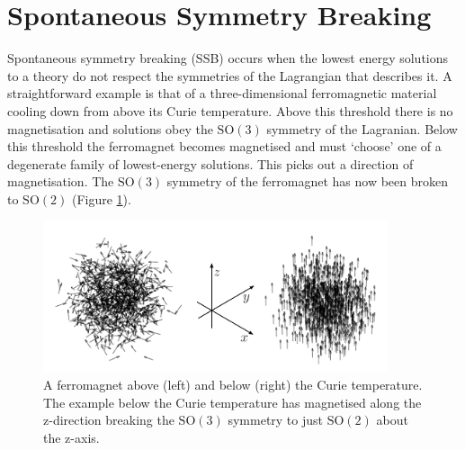 \section{Spontaneous Symmetry Breaking}
Spontaneous symmetry breaking (SSB) occurs when the lowest energy solutions to a theory do not respect the symmetries of the Lagrangian that describes it. 
A straightforward example \cite{Maggiore} is that of a three-dimensional ferromagnetic material cooling down from above its Curie temperature.
Above this threshold there is no magnetisation and solutions obey the $\mathrm{SO}(3)$ symmetry of the Lagranian. 
Below this threshold the ferromagnet becomes magnetised and must `choose' one of a degenerate family of lowest-energy solutions. This picks out a direction of magnetisation. The $\mathrm{SO}(3)$ symmetry of the ferromagnet has now been broken to $\mathrm{SO}(2)$ (Figure \ref{fig:theory:ferromagnet_ssb}).

\begin{figure}[h!]
    \centering
\includegraphics[width=0.9\textwidth]{figures/theory/ferromagnet_ssb.pdf}
\caption{A ferromagnet above (left) and below (right) the Curie temperature. The example below the Curie temperature has magnetised along the z-direction breaking the $\mathrm{SO}(3)$ symmetry to just $\mathrm{SO}(2)$ about the z-axis.}
\label{fig:theory:ferromagnet_ssb}
\end{figure}

